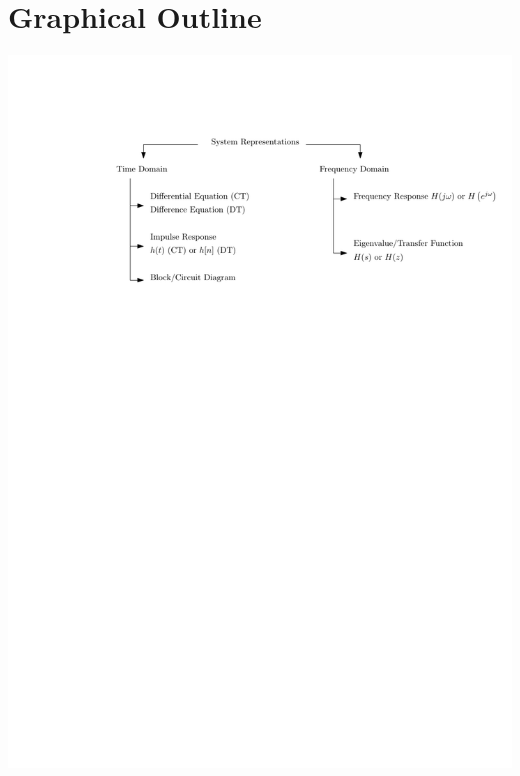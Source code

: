 \section{Graphical Outline}

\begin{center}
  \includegraphics[scale=1]{graphics/system-representations-fig.pdf}
\end{center}
